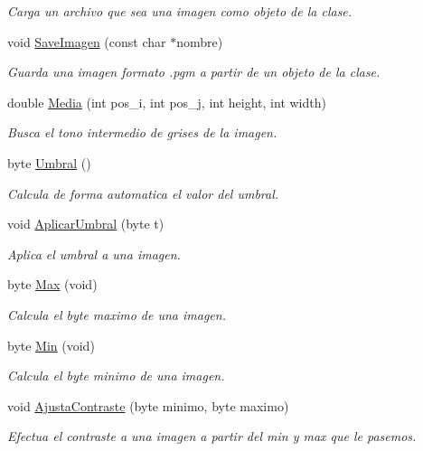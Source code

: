 \begin{DoxyCompactItemize}
\begin{DoxyCompactList}\small\item\em Carga un archivo que sea una imagen como objeto de la clase. \end{DoxyCompactList}\item 
void \hyperlink{class_imagen_a01090e15cc72178a0d26dd6b9e67b398}{Save\+Imagen} (const char $\ast$nombre)
\begin{DoxyCompactList}\small\item\em Guarda una imagen formato .pgm a partir de un objeto de la clase. \end{DoxyCompactList}\item 
double \hyperlink{class_imagen_abfdf09ba5b155a5238afdd648f3b289a}{Media} (int pos\+\_\+i, int pos\+\_\+j, int height, int width)
\begin{DoxyCompactList}\small\item\em Busca el tono intermedio de grises de la imagen. \end{DoxyCompactList}\item 
byte \hyperlink{class_imagen_a8b208fc64ea4033e6a557a8c880c5c27}{Umbral} ()
\begin{DoxyCompactList}\small\item\em Calcula de forma automatica el valor del umbral. \end{DoxyCompactList}\item 
void \hyperlink{class_imagen_ab666abb816fa66e36e68834d9d3057fb}{Aplicar\+Umbral} (byte t)
\begin{DoxyCompactList}\small\item\em Aplica el umbral a una imagen. \end{DoxyCompactList}\item 
byte \hyperlink{class_imagen_af69ad3522a0e03ba4e30cd06605a3ab0}{Max} (void)
\begin{DoxyCompactList}\small\item\em Calcula el byte maximo de una imagen. \end{DoxyCompactList}\item 
byte \hyperlink{class_imagen_adeed73bed8b0ed569e4151ebd26ffe54}{Min} (void)
\begin{DoxyCompactList}\small\item\em Calcula el byte minimo de una imagen. \end{DoxyCompactList}\item 
void \hyperlink{class_imagen_ae38179e4f7fd4a2a7171135a45eef0da}{Ajusta\+Contraste} (byte minimo, byte maximo)
\begin{DoxyCompactList}\small\item\em Efectua el contraste a una imagen a partir del min y max que le pasemos. \end{DoxyCompactList}\item 

\end{DoxyCompactItemize}
